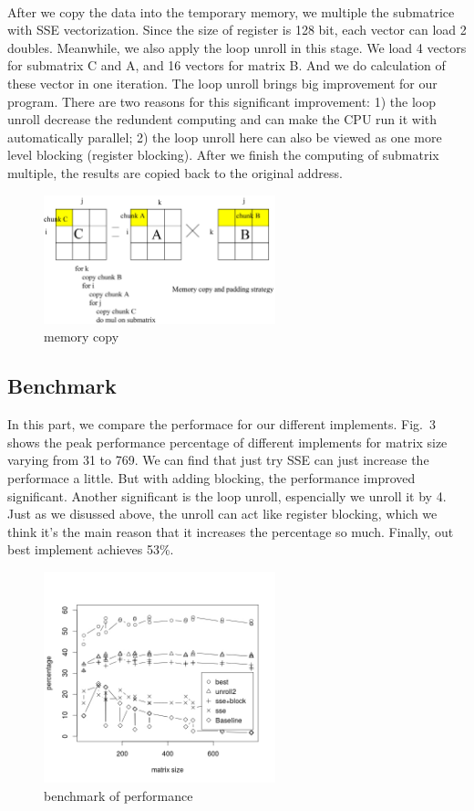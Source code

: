 \documentclass[10pt]{article}
\begin{document}
\\
After we copy the data into the temporary memory, we multiple the submatrice with SSE vectorization. Since the size of register is 128 bit, each vector can load 2 doubles. Meanwhile, we also apply the loop unroll in this stage. We load 4 vectors for submatrix C and A, and 16 vectors for matrix B. And we do calculation of these vector in one iteration. The loop unroll brings big improvement for our program. There are two reasons for this significant improvement: 1) the loop unroll decrease the redundent computing and can make the CPU run it with automatically parallel; 2) the loop unroll here can also be viewed as one more level blocking (register blocking). After we finish the computing of submatrix multiple, the results are copied back to the original address.\\  
\begin{figure}[h!]
  \centering
      \includegraphics[width=0.6\textwidth]{267_1_2.jpg}
  \caption{memory copy}
\end{figure}
\subsection{Benchmark}
In this part, we compare the performace for our different implements. Fig.~3 shows the peak performance percentage of different implements for matrix size varying from 31 to 769. We can find that just try SSE can just increase the performace a little. But with adding blocking, the performance improved significant. Another significant is the loop unroll, espencially we unroll it by 4. Just as we disussed above, the unroll can act like register blocking, which we think it's the main reason that it increases the percentage so much. Finally, out best implement achieves 53\%.
\begin{figure}[h!]
  \centering
      \includegraphics[width=0.6\textwidth]{result.jpeg}
  \caption{benchmark of performance}
\end{figure}
\end{document}
